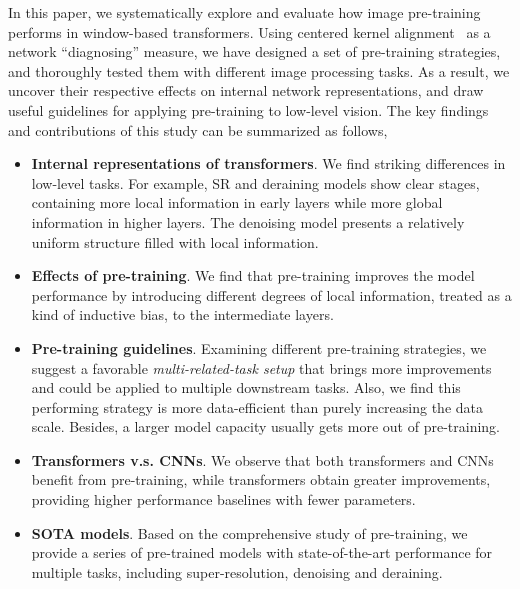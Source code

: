 \documentclass[runningheads]{llncs}
\begin{document}
	In this paper, we systematically explore and evaluate how image pre-training performs in window-based transformers. Using centered kernel alignment~\cite{kornblith2019better,cortes2012algorithms} as a network ``diagnosing'' measure, we have designed a set of pre-training strategies, and thoroughly tested them with different image processing tasks. As a result, we uncover their respective effects on internal network representations, and draw useful guidelines for applying pre-training to low-level vision. The key findings and contributions of this study can be summarized as follows,
	\vspace{-0.1in}
	\begin{itemize}
		\item \textbf{Internal representations of transformers}. We find striking differences in low-level tasks. For example, SR and deraining models show clear stages, containing more local information in early layers while more global information in higher layers. The denoising model presents a relatively uniform structure filled with local information.
		\vspace{0.03in}
		\item \textbf{Effects of pre-training}. We find that pre-training improves the model performance by introducing different degrees of local information, treated as a kind of inductive bias, to the intermediate layers.
		\vspace{0.03in}
		\item \textbf{Pre-training guidelines}. Examining different pre-training strategies, we suggest a favorable \textit{multi-related-task setup} that brings more improvements and could be applied to multiple downstream tasks. Also, we find this performing strategy is more data-efficient than purely increasing the data scale. Besides, a larger model capacity usually gets more out of pre-training.
\vspace{0.03in}
		\item \textbf{Transformers v.s. CNNs}. We observe that both transformers and CNNs benefit from pre-training, while transformers obtain greater improvements, providing higher performance baselines with fewer parameters.
		\vspace{0.03in}
		\item \textbf{SOTA models}. Based on the comprehensive study of pre-training, we provide a series of pre-trained models with state-of-the-art performance for multiple tasks, including super-resolution, denoising and deraining.
	\end{itemize}
	\vspace{-0.1in}
	
\end{document}
